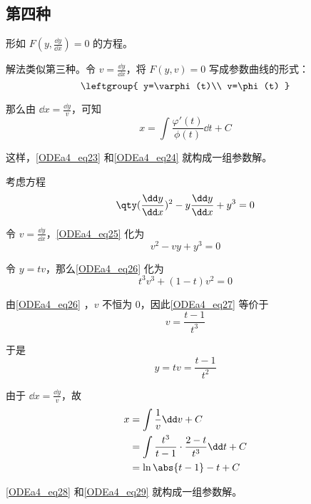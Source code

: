 \subsection{第四种}

形如 $F(y, \frac{\dd y}{\dd x})=0$ 的方程。

解法类似第三种。令 $v=\frac{\dd y}{\dd x}$，将 $F(y, v)=0$ 写成参数曲线的形式：
\begin{equation}\label{ODEa4_eq23}
\leftgroup{
    y=\varphi(t)\\
    v=\phi(t)
}
\end{equation}

那么由 $\dd x=\frac{\dd y}{v}$，可知
\begin{equation}\label{ODEa4_eq24}
x=\int \frac{\varphi'(t)}{\phi(t)}\dd t+C
\end{equation}

这样，\autoref{ODEa4_eq23} 和\autoref{ODEa4_eq24} 就构成一组参数解。

\begin{example}{}
考虑方程
\begin{equation}\label{ODEa4_eq25}
\qty(\frac{\dd y}{\dd x})^2-y\frac{\dd y}{\dd x}+y^3=0
\end{equation}

令 $v=\frac{\dd y}{\dd x}$，\autoref{ODEa4_eq25} 化为
\begin{equation}\label{ODEa4_eq26}
v^2-vy+y^3=0
\end{equation}

令 $y=tv$，那么\autoref{ODEa4_eq26} 化为
\begin{equation}\label{ODEa4_eq27}
t^3v^3+(1-t)v^2=0
\end{equation}

由\autoref{ODEa4_eq26} ，$v$ 不恒为 $0$，因此\autoref{ODEa4_eq27} 等价于
\begin{equation}
v=\frac{t-1}{t^3}
\end{equation}

于是
\begin{equation}\label{ODEa4_eq28}
y=tv=\frac{t-1}{t^2}
\end{equation}

由于 $\dd x=\frac{\dd y}{v}$，故
\begin{equation}\label{ODEa4_eq29}
\begin{aligned}
x
&=\int \frac{1}{v} \dd v+C\\
&=\int \frac{t^3}{t-1}\cdot\frac{2-t}{t^3}\dd t+C\\
&=\ln\abs{t-1}-t+C
\end{aligned}
\end{equation}

\autoref{ODEa4_eq28} 和\autoref{ODEa4_eq29} 就构成一组参数解。








\end{example}











